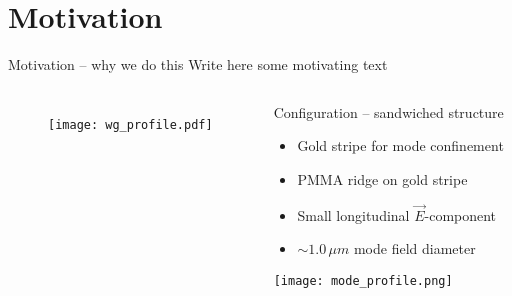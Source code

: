 \section{Motivation}
  \begin{frame}{Motivation – why we do this}
    Write here some motivating text
    \begin{columns}
        \begin{figure}
          \texttt{[image: wg\_profile.pdf]}
        \end{figure}
        \begin{block}{Configuration – sandwiched structure}
          \begin{itemize}
           \item Gold stripe for mode confinement
           \item PMMA ridge on gold stripe
           \item Small longitudinal $\vec{E}$-component
           \item $\sim 1.0\,\mu{}m$ mode field diameter
          \end{itemize}
          \begin{center}
            \texttt{[image: mode\_profile.png]}
          \end{center}
        \end{block}
    \end{columns}
  \end{frame}
  
